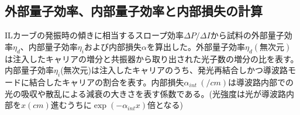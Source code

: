\clearpage
\subsection{外部量子効率、内部量子効率と内部損失の計算}%
ILカーブの発振時の傾きに相当するスロープ効率$\Delta P/\Delta I$から試料の外部量子効率$\eta_{d}$、内部量子効率$\eta_{i}$および内部損失$\alpha$を算出した。外部量子効率$\eta_{d}(無次元)$は注入したキャリアの増分と共振器から取り出された光子数の増分の比を表す。内部量子効率$\eta_{i}$(無次元)は注入したキャリアのうち、発光再結合しかつ導波路モードに結合したキャリアの割合を表す。内部損失$\alpha_{int}\ (\si{/cm})$は導波路内部での光の吸収や散乱による減衰の大きさを表す係数である。(光強度は光が導波路内部を$x\si{(cm)}$進むうちに$\exp(-\alpha_{int} x)$倍となる)

